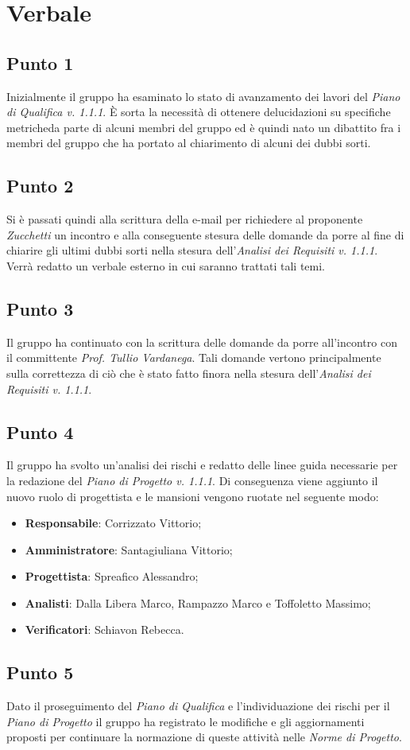 \section{Verbale}
    \subsection{Punto 1}
        Inizialmente il gruppo ha esaminato lo stato di avanzamento dei lavori del \textit{Piano di Qualifica v. 1.1.1}. È sorta la necessità di ottenere delucidazioni su specifiche metriche\glosp da parte di alcuni membri del gruppo ed è quindi nato un dibattito fra i membri del gruppo che ha portato al chiarimento di alcuni dei dubbi sorti.
    \subsection{Punto 2}
        Si è passati quindi alla scrittura della e-mail per richiedere al proponente \textit{Zucchetti} un incontro e alla conseguente stesura delle domande da porre al fine di chiarire gli ultimi dubbi sorti nella stesura dell'\textit{Analisi dei Requisiti v. 1.1.1}. Verrà redatto un verbale esterno in cui saranno trattati tali temi.
    \subsection{Punto 3}
        Il gruppo ha continuato con la scrittura delle domande da porre all'incontro con il committente \textit{Prof. Tullio Vardanega}. Tali domande vertono principalmente sulla correttezza di ciò che è stato fatto finora nella stesura dell'\textit{Analisi dei Requisiti v. 1.1.1}.
    \subsection{Punto 4}
     	Il gruppo ha svolto un'analisi dei rischi e redatto delle linee guida necessarie per la redazione del \textit{Piano di Progetto v. 1.1.1}. 
        Di conseguenza viene aggiunto il nuovo ruolo di progettista e le mansioni vengono ruotate nel seguente modo:
        \begin{itemize}
            \item \textbf{Responsabile}: Corrizzato Vittorio;
            \item \textbf{Amministratore}: Santagiuliana Vittorio;
            \item \textbf{Progettista}: Spreafico Alessandro;
            \item \textbf{Analisti}: Dalla Libera Marco, Rampazzo Marco e Toffoletto Massimo;
            \item \textbf{Verificatori}: Schiavon Rebecca. 
        \end{itemize}
    \subsection{Punto 5}
        Dato il proseguimento del \textit{Piano di Qualifica} e l'individuazione dei rischi per il \textit{Piano di Progetto} il gruppo ha registrato le modifiche e gli aggiornamenti proposti per continuare la normazione di queste attività nelle \textit{Norme di Progetto}.
    